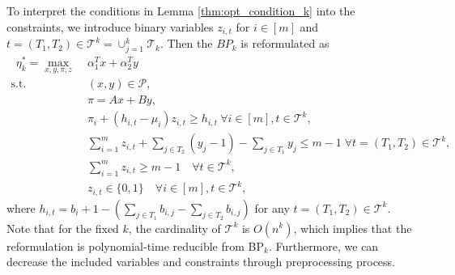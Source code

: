 \documentclass[11pt]{article}
\newcommand{\T}{\mathcal{T}}
\newcommand{\Pp}{\mathcal{P}}
\begin{document}
To interpret the conditions in Lemma \ref{thm:opt_condition_k} into the constraints, we introduce binary variables $z_{i,t}$ for $i\in [m]$ and $t=(T_1, T_2) \in \T^k=\cup_{j=1}^k \T_k$. Then the $BP_k$ is reformulated as 
\begin{align}
[BP_k]~~\eta_k^* = \max_{x, y, \pi, z}\; & \alpha_1^Tx + \alpha_2^Ty \nonumber \\
\text{s.t.~~} &  (x, y)\in \Pp, \nonumber \\
& \pi = Ax + By,  \label{eq:BP_k_1}\\
& \pi_i + (h_{i,t} - \mu_i) z_{i,t} \geq h_{i,t} ~\forall i \in [m], t\in \T^k, \label{eq:BP_k_mixing} \\
& \sum_{i=1}^m z_{i,t} + \sum_{j\in T_2} (y_j-1) - \sum_{j\in T_1}y_j \leq m-1  \; \forall t = (T_1, T_2)\in \T^k, \label{eq:BP_k_2}\\
& \sum_{i=1}^m z_{i,t} \geq m -1 \quad \forall t\in \T^k, \label{eq:BP_k_3}\\
& z_{i,t} \in \{0, 1\}\quad \forall i\in [m], t\in \T^k,
\end{align}
where $h_{i,t} = b_i + 1 - (\sum_{j\in T_1} b_{i,j}  - \sum_{j\in T_2} b_{i,j})$ for any $t = (T_1, T_2)\in \T^k.$ Note that for the fixed $k$, the cardinality of $\T^k$ is $O(n^k)$, which implies that the reformulation is polynomial-time reducible from BP$_k$. Furthermore, we can decrease the included variables and constraints through preprocessing process.\\
\end{document}
